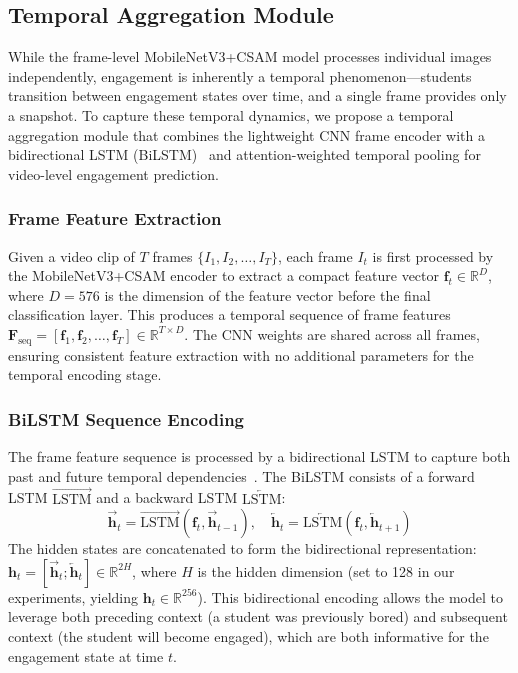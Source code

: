 \documentclass[sensors,article,submit,pdftex,moreauthors]{Definitions/mdpi}
\begin{document}
\subsection{Temporal Aggregation Module}
\label{sec:temporal}

While the frame-level MobileNetV3+CSAM model processes individual images independently, engagement is inherently a temporal phenomenon---students transition between engagement states over time, and a single frame provides only a snapshot. To capture these temporal dynamics, we propose a temporal aggregation module that combines the lightweight CNN frame encoder with a bidirectional LSTM (BiLSTM)~\cite{hochreiter1997lstm,schuster1997bilstm} and attention-weighted temporal pooling for video-level engagement prediction.

\subsubsection{Frame Feature Extraction}

Given a video clip of $T$ frames $\{I_1, I_2, \ldots, I_T\}$, each frame $I_t$ is first processed by the MobileNetV3+CSAM encoder to extract a compact feature vector $\mathbf{f}_t \in \mathbb{R}^{D}$, where $D = 576$ is the dimension of the feature vector before the final classification layer. This produces a temporal sequence of frame features $\mathbf{F}_{\text{seq}} = [\mathbf{f}_1, \mathbf{f}_2, \ldots, \mathbf{f}_T] \in \mathbb{R}^{T \times D}$. The CNN weights are shared across all frames, ensuring consistent feature extraction with no additional parameters for the temporal encoding stage.

\subsubsection{BiLSTM Sequence Encoding}

The frame feature sequence is processed by a bidirectional LSTM to capture both past and future temporal dependencies~\cite{yue2015beyond}. The BiLSTM consists of a forward LSTM $\overrightarrow{\text{LSTM}}$ and a backward LSTM $\overleftarrow{\text{LSTM}}$:
\begin{equation}
\overrightarrow{\mathbf{h}}_t = \overrightarrow{\text{LSTM}}(\mathbf{f}_t, \overrightarrow{\mathbf{h}}_{t-1}), \quad
\overleftarrow{\mathbf{h}}_t = \overleftarrow{\text{LSTM}}(\mathbf{f}_t, \overleftarrow{\mathbf{h}}_{t+1})
\end{equation}
The hidden states are concatenated to form the bidirectional representation: $\mathbf{h}_t = [\overrightarrow{\mathbf{h}}_t; \overleftarrow{\mathbf{h}}_t] \in \mathbb{R}^{2H}$, where $H$ is the hidden dimension (set to 128 in our experiments, yielding $\mathbf{h}_t \in \mathbb{R}^{256}$). This bidirectional encoding allows the model to leverage both preceding context (a student was previously bored) and subsequent context (the student will become engaged), which are both informative for the engagement state at time $t$.
\end{document}
